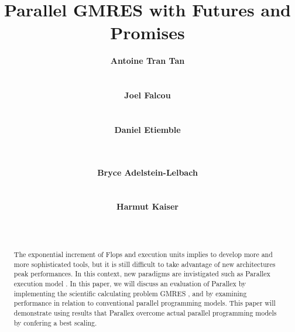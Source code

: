 \documentclass[conference]{acmsig-alternate-10pt}
\begin{document}
\title{Parallel GMRES with Futures and Promises}

\author{
\alignauthor
\small \textbf{Antoine Tran Tan} \\ %
       \\
       \\
\alignauthor
\small \textbf{Joel Falcou}\\
       \\
       \\
\alignauthor
\small \textbf{Daniel Etiemble}\\
       \\
       \\
\and
\alignauthor
\small \textbf{Bryce Adelstein-Lelbach}\\
       \\
       \\
\alignauthor
\small \textbf{Harmut Kaiser}\\
       \\
       \\
}

\maketitle

\begin{abstract}
The exponential increment of Flops and execution units implies to develop more and more sophisticated tools, but it is still difficult to take advantage of new architectures peak performances. In this context, new paradigms are invistigated such as Parallex execution model \cite{Parallex}. In this paper, we will discuss an evaluation of Parallex by implementing the scientific calculating problem GMRES \cite{GMRES}, and by examining performance in relation to conventional parallel programming models. This paper will demonstrate using results that Parallex overcome actual parallel programming models by confering a best scaling.
\end{abstract}
\end{document}

